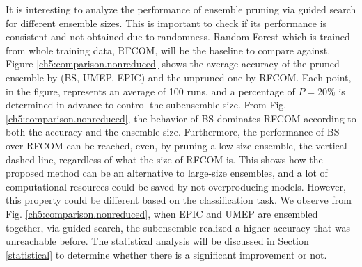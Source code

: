 It is interesting to analyze the performance of ensemble pruning via guided search for different ensemble sizes. This is important to check if its performance is consistent and not obtained due to randomness. Random Forest which is trained from whole training data, RFCOM, will be the baseline to compare against.  Figure \ref{ch5:comparison.nonreduced} shows the average accuracy of the pruned ensemble by (BS, UMEP, EPIC) and the unpruned one by RFCOM. Each point, in the figure, represents an average of 100 runs, and a percentage of $P=20\%$ is determined in advance to control the subensemble size. From Fig. \ref{ch5:comparison.nonreduced}, the behavior of BS dominates RFCOM according to both the accuracy and the ensemble size. Furthermore, the performance of BS over RFCOM can be reached, even, by pruning a low-size ensemble, the vertical dashed-line, regardless of what the size of RFCOM is. This shows how the proposed method can be an alternative to large-size ensembles, and a lot of computational resources could be saved by not overproducing models. However, this property could be different based on the classification task. We observe from Fig. \ref{ch5:comparison.nonreduced}, when EPIC and UMEP are ensembled together, via guided search, the subensemble realized a higher accuracy that was unreachable before. The statistical analysis will be discussed in Section \ref{statistical} to determine whether there is a significant improvement or not.







